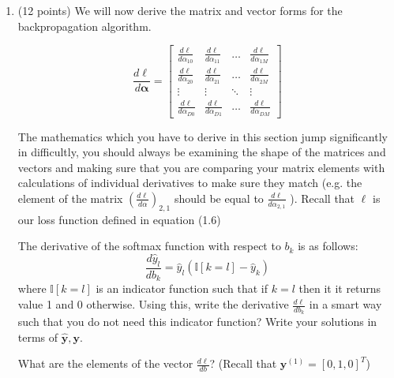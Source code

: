 \documentclass[11pt]{exam}
\numberwithin{equation}{section} %
\numberwithin{figure}{section} %
\numberwithin{table}{section} %
\newcommand{\adj}[1]{\frac{d \ell}{d #1}}
\newcommand{\Ib}{\mathbb{I}}
\newcommand{\yv}{\mathbf{y}}
\newcommand{\alphav     }{\boldsymbol \alpha     }
\begin{document}
\begin{enumerate}
\begin{questions}
	        
	        
	    \end{questions} 
	
	\item (12 points) We will now derive the matrix and vector forms for the backpropagation algorithm.
	
	$$\frac{d\ell}{d\alphav} = 
	    \begin{bmatrix}
	        \adj{\alpha_{10}} & \adj{\alpha_{11}} & \dots  & \adj{\alpha_{1M}} \\
	        \adj{\alpha_{20}} & \adj{\alpha_{21}} & \dots  & \adj{\alpha_{2M}} \\
	        \vdots      & \vdots      & \ddots & \vdots \\
	        \adj{\alpha_{D0}} & \adj{\alpha_{D1}} & \dots  & \adj{\alpha_{DM}}
	    \end{bmatrix}$$
	
	
	
	
	The mathematics which you have to derive in this section jump significantly in difficultly, you should always be examining the shape of the matrices and vectors and making sure that you are comparing your matrix elements with calculations of individual derivatives to make sure they match (e.g. the element of the matrix $(\frac{d\ell}{d\alpha})_{2,1}$ should be equal to $\frac{d\ell}{d\alpha_{2,1}}$  ). Recall that $\ell$ is our loss function defined in equation (1.6)
	    
	    \begin{questions}
	        \question[3] The derivative of the softmax function with respect to $b_k$ is as follows:
	        $$\frac{d\hat{y}_l}{db_k} = \hat{y}_l(\Ib[k=l]-\hat{y}_k)$$ 
	        where $\Ib[k=l]$ is an indicator function such that if $k=l$ then it it returns value 1 and 0 otherwise. 
	        Using this, write the derivative $\frac{d\ell}{db_k}$ in a smart way such that you do not need this indicator function? Write your solutions in terms of $\hat{\yv},\yv$.
	        
	        
	        \begin{tcolorbox}[fit,height=1cm, width=6cm, blank, borderline={1pt}{-2pt}]
	        \end{tcolorbox}
	        
	        
	        \question[2] What are the elements of the vector $\frac{d\ell}{db}$? (Recall that  $\yv^{(1)}=[0,1,0]^T$)
	        
	        
	        \begin{tcolorbox}[fit,height=1cm, width=6cm, blank, borderline={1pt}{-2pt}]
	        \end{tcolorbox}
	        

\end{questions}
\end{enumerate}
\end{document}
